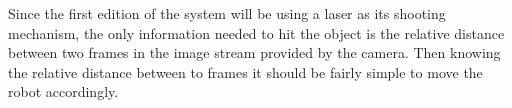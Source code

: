 Since the first edition of the system will be using a laser as its shooting mechanism, the only information needed to hit the object is the relative distance between two frames in the image stream provided by the camera. 
Then knowing the relative distance between to frames it should be fairly simple to move the robot accordingly.
